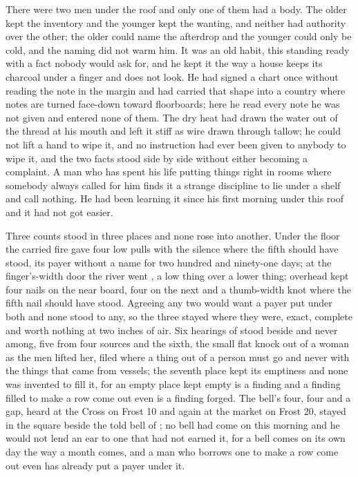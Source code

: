 There were two men under the roof and only one of them had a body. The older kept the inventory and the younger kept the wanting, and neither had authority over the other; the older could name the afterdrop and the younger could only be cold, and the naming did not warm him. It was an old habit, this standing ready with a fact nobody would ask for, and he kept it the way a house keeps its charcoal under a finger and does not look. He had signed a chart once without reading the note in the margin and had carried that shape into a country where notes are turned face-down toward floorboards; here he read every note he was not given and entered none of them. The dry heat had drawn the water out of the thread at his mouth and left it stiff as wire drawn through tallow; he could not lift a hand to wipe it, and no instruction had ever been given to anybody to wipe it, and the two facts stood side by side without either becoming a complaint. A man who has spent his life putting things right in rooms where somebody always called for him finds it a strange discipline to lie under a shelf and call nothing. He had been learning it since his first morning under this roof and it had not got easier.

\scenebreak

Three counts stood in three places and none rose into another. Under the floor the carried fire gave four low pulls with the silence where the fifth should have stood, its payer without a name for two hundred and ninety-one days; at the finger's-width door the river went , a low thing over a lower thing; overhead  kept four nails on the near board, four on the next and a thumb-width knot where the fifth nail should have stood. Agreeing any two would want a payer put under both and none stood to any, so the three stayed where they were, exact, complete and worth nothing at two inches of air. Six hearings of  stood beside and never among, five from four sources and the sixth, the small flat knock out of a woman as the men lifted her, filed where a thing out of a person must go and never with the things that came from vessels; the seventh place kept its emptiness and none was invented to fill it, for an empty place kept empty is a finding and a finding filled to make a row come out even is a finding forged. The bell's four, four and a gap, heard at the Cross on Frost 10 and again at the market on Frost 20, stayed in the square beside the told bell of ; no bell had come on this morning and he would not lend an ear to one that had not earned it, for a bell comes on its own day the way a month comes, and a man who borrows one to make a row come out even has already put a payer under it.

